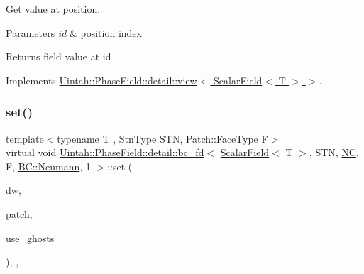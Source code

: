 Get value at position. 


\begin{DoxyParams}{Parameters}
{\em id} & position index \\
\hline
\end{DoxyParams}
\begin{DoxyReturn}{Returns}
field value at id 
\end{DoxyReturn}


Implements \hyperlink{classUintah_1_1PhaseField_1_1detail_1_1view_3_01ScalarField_3_01T_01_4_01_4_aea43cfedfe3b6f3c038ff795caec49b8}{Uintah\+::\+Phase\+Field\+::detail\+::view$<$ Scalar\+Field$<$ T $>$ $>$}.

\mbox{\label{classUintah_1_1PhaseField_1_1detail_1_1bc__fd_3_01ScalarField_3_01T_01_4_00_01STN_00_01NC_00_01F_00_01BC_1_1Neumann_00_011_01_4_a55e95036a5ed9c743cc19f644edf2d84}} 
\subsubsection{\texorpdfstring{set()}{set()}\hspace{0.1cm}{\footnotesize\ttfamily [1/2]}}
{\footnotesize\ttfamily template$<$typename T , Stn\+Type S\+TN, Patch\+::\+Face\+Type F$>$ \\
virtual void \hyperlink{classUintah_1_1PhaseField_1_1detail_1_1bc__fd}{Uintah\+::\+Phase\+Field\+::detail\+::bc\+\_\+fd}$<$ \hyperlink{structUintah_1_1PhaseField_1_1ScalarField}{Scalar\+Field}$<$ T $>$, S\+TN, \hyperlink{namespaceUintah_1_1PhaseField_a33d355affda78a83f45755ba8388cedda77924170fe82bfd58b74ca3e44139718}{NC}, F, \hyperlink{namespaceUintah_1_1PhaseField_a148fba372aa3be96fd6eede7a2fa10b5ab8537a769dbc90cb1762215441212152}{B\+C\+::\+Neumann}, 1 $>$\+::set (\begin{DoxyParamCaption}\item[{Data\+Warehouse $\ast$}]{dw,  }\item[{const Patch $\ast$}]{patch,  }\item[{bool}]{use\+\_\+ghosts }\end{DoxyParamCaption})\hspace{0.3cm}{\ttfamily [inline]}, {\ttfamily [override]}, {\ttfamily [virtual]}}



